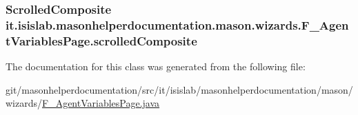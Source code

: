 \hypertarget{classit_1_1isislab_1_1masonhelperdocumentation_1_1mason_1_1wizards_1_1_f___agent_variables_page_a95b20ea3356cda7bd73e9507e43859eb}{
\subsubsection[{scrolled\-Composite}]{\setlength{\rightskip}{0pt plus 5cm}Scrolled\-Composite it.\-isislab.\-masonhelperdocumentation.\-mason.\-wizards.\-F\-\_\-\-Agent\-Variables\-Page.\-scrolled\-Composite\hspace{0.3cm}{\ttfamily [private]}}}\label{classit_1_1isislab_1_1masonhelperdocumentation_1_1mason_1_1wizards_1_1_f___agent_variables_page_a95b20ea3356cda7bd73e9507e43859eb}


The documentation for this class was generated from the following file\-:\begin{DoxyCompactItemize}
\item 
git/masonhelperdocumentation/src/it/isislab/masonhelperdocumentation/mason/wizards/\hyperlink{_f___agent_variables_page_8java}{F\-\_\-\-Agent\-Variables\-Page.\-java}\end{DoxyCompactItemize}
